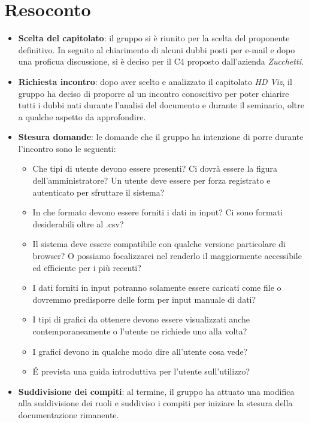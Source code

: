 \section{Resoconto}
\begin{itemize}

\item \textbf{Scelta del capitolato}: il gruppo si è riunito per la scelta del proponente definitivo. In seguito al chiarimento di alcuni dubbi posti per e-mail e dopo una proficua discussione, si è deciso per il  C4 proposto dall'azienda \textit{Zucchetti}.

\item \textbf{Richiesta incontro}: dopo aver scelto e analizzato il capitolato \textit{HD Viz}, il gruppo ha deciso di proporre al  un incontro conoscitivo per poter chiarire tutti i dubbi nati durante l'analisi del documento e durante il seminario, oltre a qualche aspetto da approfondire.

\item \textbf{Stesura domande}: le domande che il gruppo ha intenzione di porre durante l'incontro sono le seguenti:
\begin{itemize}
\item Che tipi di utente devono essere presenti? Ci dovrà essere la figura dell'amministratore? Un utente deve essere per forza registrato e autenticato per sfruttare il sistema?
\item In che formato devono essere forniti i dati in input? Ci sono formati desiderabili oltre al .csv?
\item Il sistema deve essere compatibile con qualche versione particolare di browser? O possiamo focalizzarci nel renderlo il maggiormente accessibile ed efficiente per i più recenti?
\item I dati forniti in input potranno solamente essere caricati come file o dovremmo predisporre delle form per input manuale di dati?
\item I tipi di grafici da ottenere devono essere visualizzati anche contemporaneamente o l'utente ne richiede uno alla volta?
\item I grafici devono in qualche modo dire all'utente cosa vede?
\item \'E prevista una guida introduttiva per l'utente sull'utilizzo?
\end{itemize}

\item \textbf{Suddivisione dei compiti}: al termine, il gruppo ha attuato una modifica alla suddivisione dei ruoli e suddiviso i compiti per iniziare la stesura della documentazione rimanente.

\end{itemize}